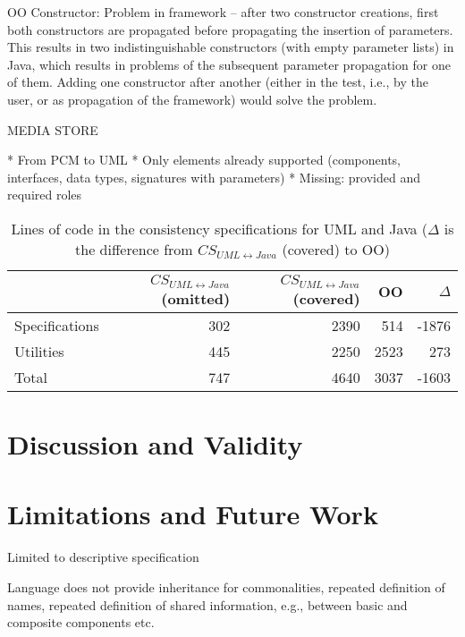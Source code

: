 OO Constructor: Problem in \vitruv framework -- after two constructor creations, first both constructors are propagated before propagating the insertion of parameters. This results in two indistinguishable constructors (with empty parameter lists) in Java, which results in problems of the subsequent parameter propagation for one of them.
Adding one constructor after another (either in the test, i.e., by the user, or as propagation of the framework) would solve the problem.


MEDIA STORE

* From PCM to UML
* Only elements already supported (components, interfaces, data types, signatures with parameters)
* Missing: provided and required roles


\begin{table}[htb]
	\centering
		\begin{tabular}{lrrrr}
			\toprule
			\multicolumn{1}{l}{\bfseries } & \multicolumn{1}{r}{$CS_{{UML}\leftrightarrow{Java}}$ (omitted)} & \multicolumn{1}{r}{$CS_{{UML}\leftrightarrow{Java}}$ (covered)} & \multicolumn{1}{r}{OO} & \multicolumn{1}{r}{$\Delta$}\\
			\midrule
			Specifications 			& 302	& 2390 	& 514 	& -1876 \\
			Utilities				& 445	& 2250	& 2523 	& 273 \\
			\midrule
			Total					& 747	& 4640 	& 3037 	& -1603\\
			\bottomrule
		\end{tabular}
	\caption[Lines of code in the consistency specifications for UML and Java]{Lines of code in the consistency specifications for UML and Java ($\Delta$ is the difference from $CS_{{UML}\leftrightarrow{Java}}$ (covered) to OO)}
	\label{tab:commonalities_evaluation:reactions_comparison}
\end{table}



\section{Discussion and Validity}

\section{Limitations and Future Work}
Limited to descriptive specification

Language does not provide inheritance for commonalities, repeated definition of names, repeated definition of shared information, e.g., between basic and composite components etc.

